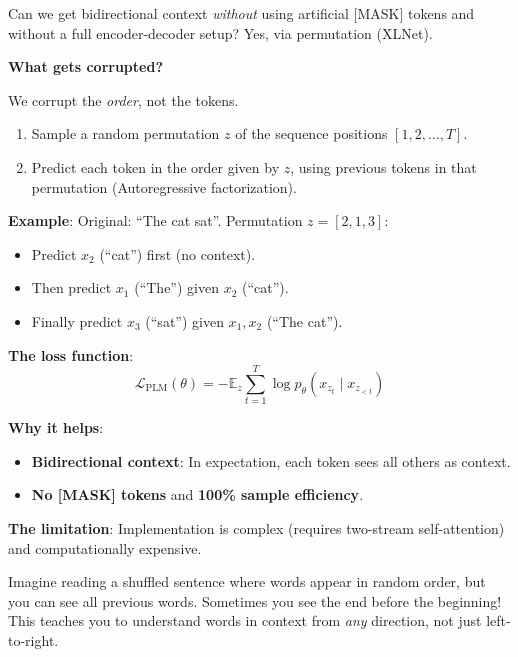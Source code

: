 \documentclass{article}
\begin{document}
Can we get bidirectional context \textit{without} using artificial [MASK] tokens and without a full encoder-decoder setup? Yes, via permutation (XLNet).

\textbf{What gets corrupted?}

We corrupt the \textit{order}, not the tokens.

\begin{enumerate}
\item Sample a random permutation $z$ of the sequence positions $[1, 2, \ldots, T]$.
\item Predict each token in the order given by $z$, using previous tokens in that permutation (Autoregressive factorization).
\end{enumerate}

\textbf{Example}: Original: ``The cat sat''. Permutation $z = [2, 1, 3]$:
\begin{itemize}
\item Predict $x_2$ (``cat'') first (no context).
\item Then predict $x_1$ (``The'') given $x_2$ (``cat'').
\item Finally predict $x_3$ (``sat'') given $x_1, x_2$ (``The cat'').
\end{itemize}

\textbf{The loss function}:
\begin{equation}
\mathcal{L}_{\text{PLM}}(\theta) = -\mathbb{E}_{z} \sum_{t=1}^{T} \log p_\theta(x_{z_t} \mid x_{z_{<t}})
\end{equation}

\textbf{Why it helps}:

\begin{itemize}
\item \textbf{Bidirectional context}: In expectation, each token sees all others as context.
\item \textbf{No [MASK] tokens} and \textbf{100\% sample efficiency}.
\end{itemize}

\textbf{The limitation}: Implementation is complex (requires two-stream self-attention) and computationally expensive.

\begin{tcolorbox}[colback=yellow!5!white, colframe=orange!50!black, title=Intuition: The Shuffled Deck]
Imagine reading a shuffled sentence where words appear in random order, but you can see all previous words. Sometimes you see the end before the beginning! This teaches you to understand words in context from \textit{any} direction, not just left-to-right.
\end{tcolorbox}
\end{document}
